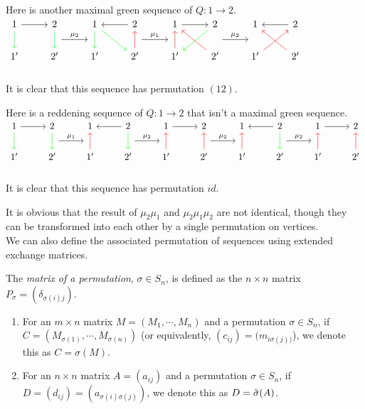 \begin{example}
Here is another maximal green sequence of $Q:1\to 2$.\\
$\begin{tikzcd}
 1 \arrow[r] \arrow[d,green] & 2\arrow [d,green]\arrow[r,"\mu_2", shift right=3.5ex] & 1\arrow[dr,green]\arrow[d,green]&2\arrow[l]\arrow[r,"\mu_1", shift right=3.5ex]&1\arrow[r]&2\arrow[dl,green]\arrow[r,"\mu_2", shift right=3.5ex]&1&2\arrow[l]\\
 1' & 2'& 1'&2'\arrow[u,red]&1'\arrow[u,red]&2'\arrow[ul,red]&1'\arrow[ur,red]&2'\arrow[ul,red]\\
\end{tikzcd}$\\
\indent It is clear that this sequence has permutation $(12)$.
\end{example}
\begin{example}
Here is a reddening sequence of $Q:1\to 2$ that isn't a maximal green sequence.\\
$\begin{tikzcd}
1 \arrow[r] \arrow[d,green] & 2\arrow [d,green]\arrow[r,"\mu_1", shift right=3.5ex]  & 1&2\arrow[l]\arrow[d,green]\arrow[r,"\mu_2", shift right=3.5ex]&1\arrow[r] & 2 \arrow[r,"\mu_2", shift right=3.5ex] & 1&2\arrow[l]\arrow[d,green]\arrow[r,"\mu_2", shift right=3.5ex] & 1\arrow[r] & 2\\
1' & 2'&1'\arrow[u,red]& 2'&1'\arrow[u,red] & 2'\arrow[u,red] & 1'\arrow[u,red]& 2'&1'\arrow[u,red] & 2'\arrow[u,red]\\
\end{tikzcd}$\\
\indent It is clear that this sequence has permutation $id$.
\end{example}
\indent It is obvious that the result of $\mu_2\mu_1$ and $\mu_2\mu_1\mu_2$ are not identical, though they can be transformed into each other by a single permutation on vertices.\\
\indent We can also define the associated permutation of sequences using extended exchange matrices.\\
\begin{definition}
The \textit{matrix of a permutation}, $\sigma\in S_n$, is defined as the $n\times n$ matrix $P_\sigma=(\delta_{\sigma(i)j})$.\\
\end{definition}
\begin{definition}
\begin{enumerate}
\item For an $m\times n$ matrix $M=(M_1,\cdots, M_n)$ and a permutation $\sigma\in S_n$, if $C=(M_{\sigma(1)},\cdots,M_{\sigma(n)})$ (or equivalently, $(c_{ij})=(m_{i\sigma(j))}$), we denote this as $C=\sigma(M)$.
\item For an $n\times n$ matrix $A=(a_{ij})$ and a permutation $\sigma\in S_n$, if $D=(d_{ij})=(a_{\sigma(i)\sigma(j)})$, we denote this as $D=\tilde{\sigma}(A)$.
\end{enumerate}
\end{definition}

